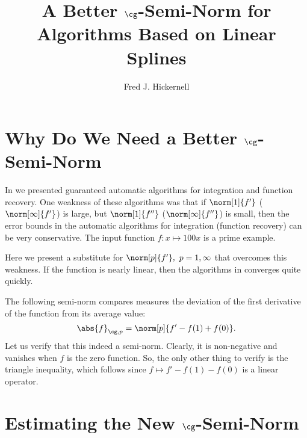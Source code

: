 \documentclass[final]{elsarticle}
\newcommand{\Gnorm}[2]{\abs{#2}_{\cg,#1}}
\theoremstyle{definition}
\theoremstyle{remark}
\begin{document}
\begin{frontmatter}

\title{A Better $\cg$-Semi-Norm for Algorithms Based on Linear Splines}
\author{Fred J. Hickernell}
\address{Room E1-208, Department of Applied Mathematics, Illinois Institute of Technology,\\ 10 W.\ 32$^{\text{nd}}$ St., Chicago, IL 60616}
\begin{abstract}
\end{abstract}

\begin{keyword}


\end{keyword}
\end{frontmatter}

\section{Why Do We Need a Better $\cg$-Semi-Norm}
In \cite{HicEtal14b} we presented guaranteed automatic algorithms for integration and function recovery.  One weakness of these algorithms was that if $\norm[1]{f'}$ ($\norm[\infty]{f'}$) is large, but $\norm[1]{f''}$ ($\norm[\infty]{f''}$) is small, then the error bounds in the automatic algorithms for integration (function recovery) can be very conservative.  The input function $f:x\mapsto 100 x$ is a prime example.

Here we present a substitute for $\norm[p]{f'}, \ p=1,\infty$ that overcomes this weakness.  If the function is nearly linear, then the algorithms in \cite{HicEtal14b} converges quite quickly.

The following semi-norm compares measures the deviation of the first derivative of the function from its average value:
\begin{equation} \label{Gnormdef}
\Gnorm{p}{f}=\norm[p]{f' - f(1)+f(0)}.
\end{equation}
Let us verify that this indeed a semi-norm.  Clearly, it is non-negative and vanishes when $f$ is the zero function.  So, the only other thing to verify is the triangle inequality, which follows since $f \mapsto f' - f(1)-f(0)$ is a linear operator.

\section{Estimating the New $\cg$-Semi-Norm}
\end{document}
